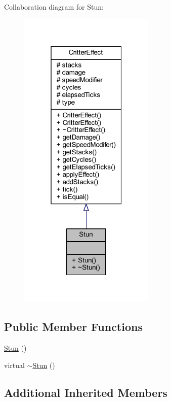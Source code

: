 Collaboration diagram for Stun\+:\nopagebreak
\begin{figure}[H]
\begin{center}
\leavevmode
\includegraphics[width=184pt]{struct_stun__coll__graph}
\end{center}
\end{figure}
\subsection*{Public Member Functions}
\begin{DoxyCompactItemize}
\item 
\hyperlink{struct_stun_a99f94643774440019ec7f9238c5b0f17}{Stun} ()
\item 
virtual \hyperlink{struct_stun_a844edb4bce5c42768c5866edd009bf28}{$\sim$\+Stun} ()
\end{DoxyCompactItemize}
\subsection*{Additional Inherited Members}


